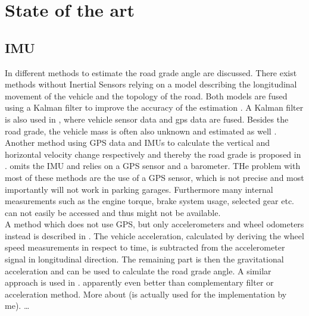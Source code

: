 \chapter{State of the art}
\label{ch:StateOfTheArt}




\section{IMU}
In \cite{Jauch2018} different methods to estimate the road grade angle are discussed.
There exist methods without Inertial Sensors relying on a model describing the longitudinal movement of the vehicle and the topology of the road.
Both models are fused using a Kalman filter to improve the accuracy of the estimation \cite{SAHLHOLM200755}.
A Kalman filter is also used in \cite{Sahlholm2010}, where vehicle sensor data and \gls{gps} data are fused.
Besides the road grade, the vehicle mass is often also unknown and estimated as well \cite{Sahlholm2010,Maleej2015}.
Another method using GPS data and IMUs to calculate the vertical and horizontal velocity change respectively and thereby the road grade is proposed in \cite{Ryu2004}.
\cite{YazdaniBoroujeni2014} omits the IMU and relies on a GPS sensor and a barometer.
THe problem with most of these methods are the use of a GPS sensor, which is not precise and most importantly will not work in parking garages.
Furthermore many internal measurements such as the engine torque, brake system usage, selected gear etc. can not easily be accessed and thus might not be available.\\
A method which does not use GPS, but only accelerometers and wheel odometers instead is described in \cite{Nilsson2012}.
The vehicle acceleration, calculated by deriving the wheel speed measurements in respect to time, is subtracted from the accelerometer signal in longitudinal direction.
The remaining part is then the gravitational acceleration and can be used to calculate the road grade angle.
A similar approach is used in \cite{Sentouh2008}.
 \cite{He2020} apparently even better than complementary filter or acceleration method.
More about \cite{Palella2016} (is actually used for the implementation by me).
\dots\\




